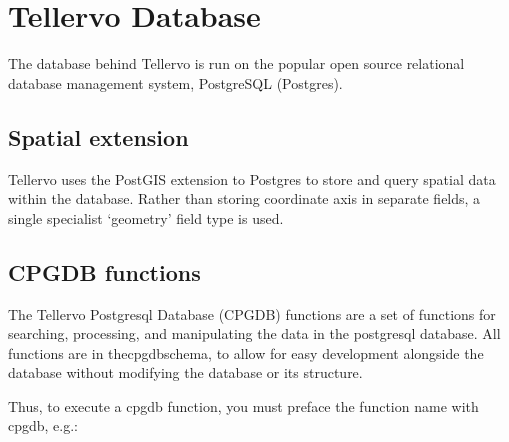 \chapter{Tellervo Database}

The database behind Tellervo is run on the popular open source relational database management system, PostgreSQL (Postgres). 




\section{Spatial extension}

Tellervo uses the PostGIS extension to Postgres to store and query spatial data within the database.  Rather than storing coordinate axis in separate fields, a single specialist `geometry' field type is used.


\section{CPGDB functions}
\label{txt:cpgdbfunctions}
The Tellervo Postgresql Database (CPGDB) functions are a set of functions for searching, processing, and manipulating the data in the postgresql database. All functions are in thecpgdbschema, to allow for easy development alongside the database without modifying the database or its structure.

Thus, to execute a cpgdb function, you must preface the function name with cpgdb, e.g.: 




